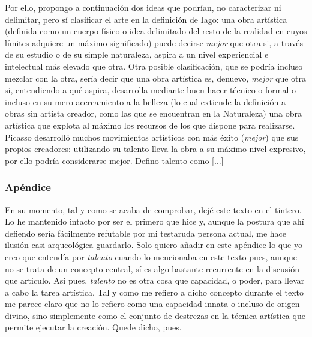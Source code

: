 \documentclass[a4paper,12pt]{article}
\begin{document}
Por ello, propongo a continuación dos ideas que podrían, no caracterizar ni delimitar, pero sí clasificar el arte en la definición de Iago: una obra artística (definida como un cuerpo físico o idea delimitado del resto de la realidad en cuyos límites adquiere un máximo significado) puede decirse \textit{mejor} que otra si, a través de su estudio o de su simple naturaleza, aspira a un nivel experiencial e intelectual más elevado que otra. Otra posible clasificación, que se podría incluso mezclar con la otra, sería decir que una obra artística es, denuevo, \textit{mejor} que otra si, entendiendo a qué aspira, desarrolla mediante buen hacer técnico o formal o incluso en su mero acercamiento a la belleza (lo cual extiende la definición a obras sin artista creador, como las que se encuentran en la Naturaleza) una obra artística que explota al máximo los recursos de los que dispone para realizarse. Picasso desarrolló muchos movimientos artísticos con más éxito (\textit{mejor}) que sus propios creadores: utilizando su talento lleva la obra a su máximo nivel expresivo, por ello podría considerarse mejor. Defino talento como [...]

\subsubsection*{Apéndice}
En su momento, tal y como se acaba de comprobar, dejé este texto en el tintero. Lo he mantenido intacto por ser el primero que hice y, aunque la postura que ahí defiendo sería fácilmente refutable por mi testaruda persona actual, me hace ilusión casi arqueológica guardarlo. Solo quiero añadir en este apéndice lo que yo creo que entendía por \textit{talento} cuando lo mencionaba en este texto pues, aunque no se trata de un concepto central, sí es algo bastante recurrente en la discusión que articulo. Así pues, \textit{talento} no es otra cosa que capacidad, o poder, para llevar a cabo la tarea artística. Tal y como me refiero a dicho concepto durante el texto me parece claro que no lo refiero como una capacidad innata o incluso de origen divino, sino simplemente como el conjunto de destrezas en la técnica artística que permite ejecutar la creación. Quede dicho, pues.
\end{document}

